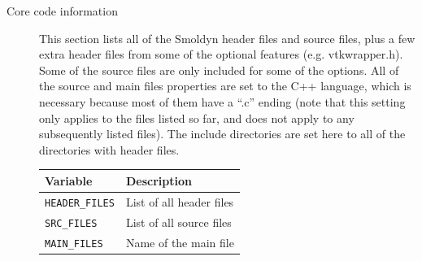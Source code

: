 \documentclass {scrbook}
\newcommand {\ttt} {\texttt}
\begin{document}
\begin{description}
\item[Core code information]
This section lists all of the Smoldyn header files and source files, plus a few extra header files from some of the optional features (e.g. vtkwrapper.h). Some of the source files are only included for some of the options. All of the source and main files properties are set to the C++ language, which is necessary because most of them have a ``.c'' ending (note that this setting only applies to the files listed so far, and does not apply to any subsequently listed files). The include directories are set here to all of the directories with header files.
\begin{longtable}[c]{ll}
Variable & Description\\
\hline
\ttt{HEADER\_FILES} & List of all header files\\
\ttt{SRC\_FILES} & List of all source files\\
\ttt{MAIN\_FILES} & Name of the main file\\
\end{longtable}


\end{description}
\end{document}

